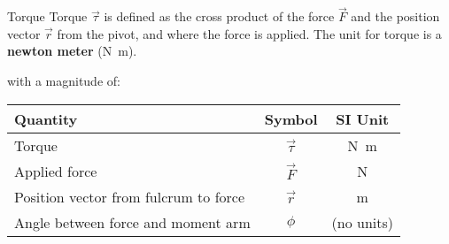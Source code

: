 \documentclass[12pt,compress,aspectratio=169]{beamer}
\begin{document}
\begin{frame}{Torque}
  Torque $\vec\tau$ is defined as the cross product of the force $\vec F$ and
  the position vector $\vec r$ from the pivot, and where the force is applied.
  The unit for torque is a \textbf{newton meter} (\si{\newton\metre}).


  \vspace{-.1in}with a magnitude of:


  \begin{center}
    \begin{tabular}{l|c|c}
      \rowcolor{pink}
      \textbf{Quantity} & \textbf{Symbol} & \textbf{SI Unit} \\ \hline
      Torque        & $\vec\tau$ & \si{\newton\metre} \\
      Applied force & $\vec F$   & \si\newton \\
      Position vector from fulcrum to force & $\vec r$ & \si\metre \\
      Angle between force and moment arm & $\phi$ & (no units)
    \end{tabular}
  \end{center}
\end{frame}
\end{document}
